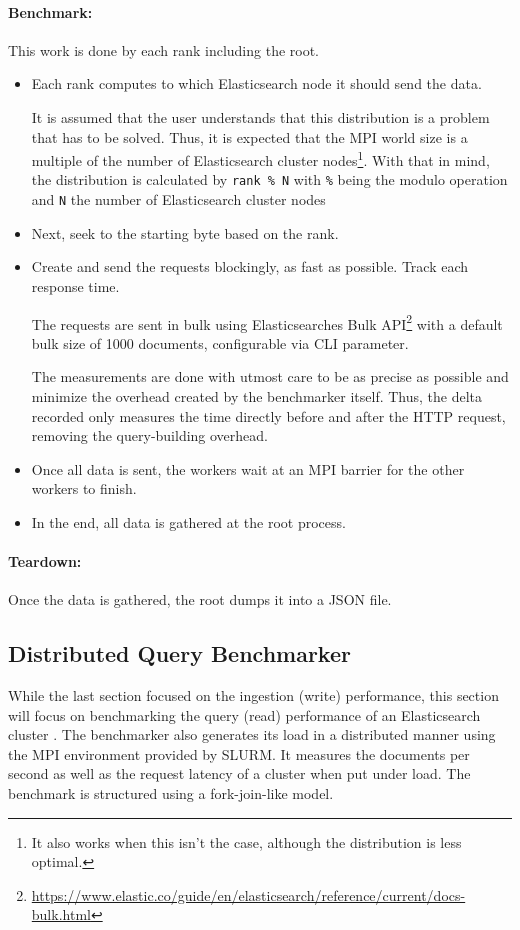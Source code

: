 \paragraph{Benchmark:} This work is done by each rank including the root.
\begin{itemize}
  \item Each rank computes to which Elasticsearch node it should send the data. 

    It is assumed that the user understands that this distribution is a problem that has to be solved. Thus, it is expected that the \ac{MPI} world size is a multiple of the number of Elasticsearch cluster nodes\footnote{It also works when this isn't the case, although the distribution is less optimal.}. With that in mind, the distribution is calculated by \texttt{rank \% N} with \texttt{\%} being the modulo operation and \texttt{N} the number of Elasticsearch cluster nodes

  \item Next, seek to the starting byte based on the rank.
  \item Create and send the requests blockingly, as fast as possible. Track each response time.

    The requests are sent in bulk using Elasticsearches Bulk API\footnote{\url{https://www.elastic.co/guide/en/elasticsearch/reference/current/docs-bulk.html}} with a default bulk size of 1000 documents, configurable via CLI parameter.

    The measurements are done with utmost care to be as precise as possible and minimize the overhead created by the benchmarker itself. Thus, the delta recorded only measures the time directly before and after the HTTP request, removing the query-building overhead.
  \item Once all data is sent, the workers wait at an \ac{MPI} barrier for the other workers to finish.
  \item In the end, all data is gathered at the root process.
\end{itemize}

\paragraph{Teardown:}
Once the data is gathered, the root dumps it into a \ac{JSON} file.

\subsection{Distributed Query Benchmarker}
While the last section focused on the ingestion (write) performance, this section will focus on benchmarking the query (read) performance of an Elasticsearch cluster \cite{myquery}. The benchmarker also generates its load in a distributed manner using the \ac{MPI} environment provided by SLURM. It measures the documents per second as well as the request latency of a cluster when put under load. The benchmark is structured using a fork-join-like model. 

